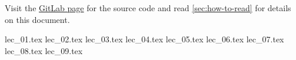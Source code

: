 \documentclass[10pt,english,a4paper, fancyfoot, git]{mkessler-script}
\author{Maximilian Keßler}
\begin{document}
\maketitle
\vfill
\doclicenseThis
Visit the
\href{https://gitlab.com/latexci/lecture-notes-bonn/topology-2}{GitLab page}
for the source code and read
\autoref{sec:how-to-read}
for details on this document.

\cleardoublepage
\tableofcontents

\cleardoublepage
\listoflecture

\cleardoublepage

    {lec_01.tex}
    {lec_02.tex}
    {lec_03.tex}
    {lec_04.tex}
    {lec_05.tex}
    {lec_06.tex}
    {lec_07.tex}
    {lec_08.tex}
    {lec_09.tex}

\appendix

\cleardoublepage


\cleardoublepage


\cleardoublepage


\cleardoublepage


\cleardoublepage
\printbibliography

\printvocabindex
\end{document}
